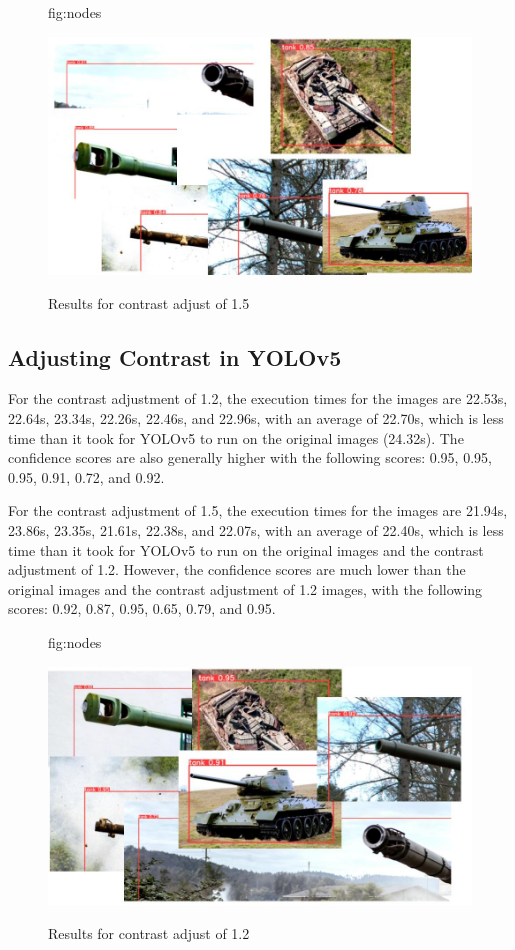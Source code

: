 \documentclass[pmlr,twocolumn,10pt]{jmlr} %
\begin{document}
\begin{figure}[htbp]
\floatconts
  {fig:nodes}
  {\caption{Results for contrast adjust of 1.5}}
  {\includegraphics[width=1\linewidth]{images/Yolo8Con15.jpg}}
\end{figure}

\subsection{Adjusting Contrast in YOLOv5}
\label{sec:figures}
For the contrast adjustment of 1.2, the execution times for the images are 22.53s, 22.64s, 23.34s, 22.26s, 22.46s, and 22.96s, with an average of 22.70s, which is less time than it took for YOLOv5 to run on the original images (24.32s). The confidence scores are also generally higher with the following scores: 0.95, 0.95, 0.95, 0.91, 0.72, and 0.92.

For the contrast adjustment of 1.5, the execution times for the images are 21.94s, 23.86s, 23.35s, 21.61s, 22.38s, and 22.07s, with an average of 22.40s, which is less time than it took for YOLOv5 to run on the original images and the contrast adjustment of 1.2. However, the confidence scores are much lower than the original images and the contrast adjustment of 1.2 images, with the following scores: 0.92, 0.87, 0.95, 0.65, 0.79, and 0.95.

\begin{figure}[htbp]
\floatconts
  {fig:nodes}
  {\caption{Results for contrast adjust of 1.2}}
  {\includegraphics[width=1\linewidth]{images/Yolo5Con12.jpg}}
\end{figure}
\end{document}
